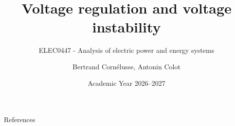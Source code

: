 \documentclass[aspectratio=169]{beamer}
\subtitle{ELEC0447 - Analysis of electric power and energy systems}
\title{Voltage regulation and voltage instability}
\author[BC]{Bertrand Cornélusse, Antonin Colot}
\institute{University of Liège}
\date{Academic Year 2026--2027}
\begin{document}


\begin{frame}[allowframebreaks]{References}
    
    
\end{frame}
\end{document}
